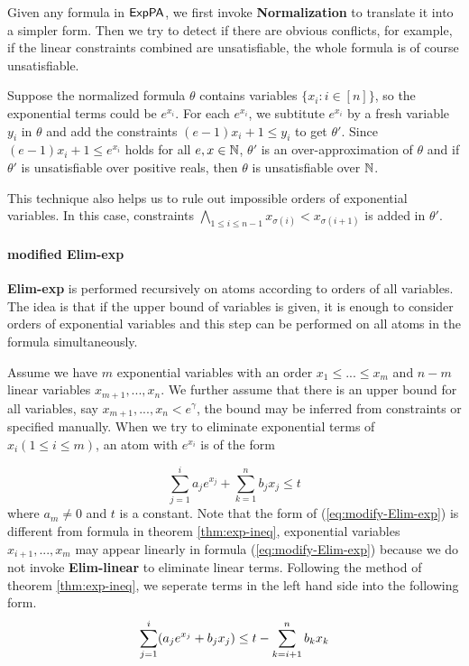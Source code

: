 {Given any formula in ${\sf ExpPA}$, we first invoke \textbf{Normalization} to translate it into a simpler form. Then we  try to detect if there are obvious conflicts, for example, if the linear constraints combined are unsatisfiable, the whole formula is of course unsatisfiable.

Suppose the normalized formula $\theta$ contains variables $\{x_i:i\in[n]\}$, so the exponential terms could be $e^{x_i}$. For each $e^{x_i}$, we subtitute $e^{x_i}$ by a fresh variable $y_i$ in $\theta$ and add the constraints $(e-1)x_i+1\le y_i$ to get $\theta'$. Since $(e-1)x_i+1\le e^{x_i}$ holds for all $e,x\in \mathbb{N}$, $\theta'$ is an over-approximation of $\theta$ and if $\theta'$ is unsatisfiable over positive reals, then $\theta$ is unsatisfiable over $\mathbb{N}$.

This technique also helps us to rule out impossible orders of exponential variables. In this case, constraints $\bigwedge_{1\le i\le n-1} x_{\sigma(i)}<x_{\sigma(i+1)}$ is added in $\theta'$.

\paragraph{modified \textbf{Elim-exp}}\label{para: modified Elim-exp}

\textbf{Elim-exp} is performed recursively on atoms according to orders of all variables. The idea is that if the upper bound of variables is given, it is enough to consider orders of exponential variables and this step can be performed on all atoms in the formula simultaneously.

Assume we have $m$ exponential variables with an order $x_1\le ...\le x_m$ and $n-m$ linear variables $x_{m+1},...,x_n$. We further assume that there is an upper bound for all variables, say $x_{m+1},...,x_n< e^\gamma$, the bound may be inferred from constraints or specified manually. When we try to eliminate exponential terms of $x_i(1\le i\le m)$, an atom with $e^{x_i}$ is of the form 

\begin{equation}\label{eq:modify-Elim-exp}
    \sum_{j=1}^i a_j e^{x_j}+\sum_{k=1}^n b_j x_j\le t 
\end{equation}
where $a_m\neq 0$ and $t$ is a constant. Note that the form of (\ref{eq:modify-Elim-exp}) is different from formula in theorem \ref{thm:exp-ineq}, exponential variables $x_{i+1},...,x_{m}$ may appear linearly in formula (\ref{eq:modify-Elim-exp}) because we do not invoke \textbf{Elim-linear} to eliminate linear terms. Following the method of theorem \ref{thm:exp-ineq}, we seperate terms in the left hand side into the following form.
\begin{equation}
    \sum_{j=1}^i (a_j e^{x_j} + b_j x_j) \le t -\sum_{k=i+1}^n b_k x_k \notag
\end{equation}

}
